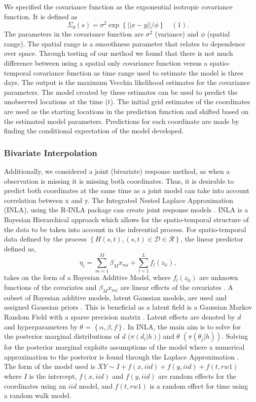 \documentclass[12pt]{article}
\begin{document}
We specified the covariance function as the exponential isotropic
covariance function. It is defined as
\[\Sigma_{\theta}(s) = \sigma^2\exp\left\{||x-y||/\phi\right\} \quad (1).\]
The parameters in the covariance function are \(\sigma^2\) (variance)
and \(\phi\) (spatial range). The spatial range is a smoothness
parameter that relates to dependence over space. Through testing of our
method we found that there is not much difference between using a
spatial only covariance function versus a spatio-temporal covariance
function as time range used to estimate the model is three days. The
output is the maximum Vecchia likelihood estimates for the covariance
parameters. The model created by these estimates can be used to predict
the unobserved locations at the time (\(t\)). The initial grid estimates
of the coordinates are used as the starting locations in the prediction
function and shifted based on the estimated model parameters.
Predictions for each coordinate are made by finding the conditional
expectation of the model developed.

\hypertarget{bivariate-interpolation}{%
\subsubsection{Bivariate Interpolation}\label{bivariate-interpolation}}

Additionally, we considered a joint (bivariate) response method, as when
a observation is missing it is missing both coordinates. Thus, it is
desirable to predict both coordinates at the same time as a joint model
can take into account correlation between x and y. The Integrated Nested
Laplace Approximation (INLA), using the R-INLA package can create joint
response models \citep[\citet{rue_review_2017}]{rue_inla_2009}. INLA is
a Bayesian Hierarchical approach which allows for the spatio-temporal
structure of the data to be taken into account in the inferential
process. For spatio-temporal data defined by the process
\(\left\{H(s,t), (s,t) \in \mathcal{D} \in \mathcal{R}\right\}\), the
linear predictor defined as,
\[\eta_{i} = \sum^{M}_{m=1}\beta_{M}x_{mi} + \sum^{L}_{l=1}f_{l}(z_{li}),\]
takes on the form of a Bayesian Additive Model, where \(f_{l}(z_{li})\)
are unknown functions of the covariates and \(\beta_{M}x_{mi}\) are
linear effects of the covariates \citep{BLANGIARDO201333}. A subset of
Bayesian additive models, latent Gaussian models, are used and assigned
Gaussian priors \citep{MORAGA2021100440}. This is beneficial as a latent
field is a Gaussian Markov Random Field with a sparse precision matrix
\citep{BLANGIARDO201333}. Latent effects are denoted by \(d\) and
hyperparameters by \(\theta\) = \(\left\{\alpha, \beta, f\right\}\). In
INLA, the main aim is to solve for the posterior marginal distributions
of \(d\) (\(\pi(d_i|h)\)) and \(\theta\) \((\pi(\theta_j|h))\). Solving
for the posterior marginal exploits assumptions of the model where a
numerical approximation to the posterior is found through the Laplace
Approximation \citep{rue_inla_2009}. The form of the model used is
\(XY \sim I + f(x,iid) + f(y,iid) + f(t, rw1)\) where \(I\) is the
intercept, \(f(x,iid)\) and \(f(y,iid)\) are random effects for the
coordinates using an \(iid\) model, and \(f(t, rw1)\) is a random effect
for time using a random walk model.
\end{document}

